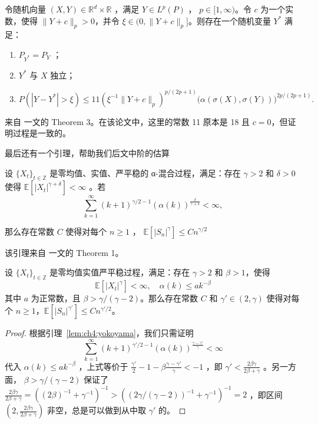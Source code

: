 \begin{lemma}[Bradley 引理]\label{lem:ch4:bradley}

令随机向量 $(X,Y)\in \mathbb{R}^d\times \mathbb{R}$ ，满足 $Y\in L^p(P)$ ， $p\in [1,\infty)$。令 $c$ 为一个实数，使得 $\| Y + c\| _p > 0$，并令 $\xi \in (0,\| Y + c\| _p]$。则存在一个随机变量 $Y^{*}$ 满足：

\begin{enumerate}
\def\labelenumi{\arabic{enumi}.}
\tightlist
\item
  $P_{Y^{*}} = P_{Y}$ ；
\item
  $Y^{*}$ 与 $X$ 独立；
\item
  \[
  P(|Y-Y^*|>\xi)
  \leq 11(\xi^{-1}\|Y+c\|_p)^{p/(2p+1)}
  \bigl(\alpha(\sigma(X),\sigma(Y))\bigr)^{2p/(2p+1)}.
  \]
\end{enumerate}

\end{lemma}
来自 \cite{bradley1983} 一文的 Theorem 3。在该论文中，这里的常数 11 原本是 18 且 $c = 0$，但证明过程是一致的。

最后还有一个引理，帮助我们后文中阶的估算


\begin{lemma}[横山良三矩界]\label{lem:ch4:yokoyama}

设 $\{X_t\}_{t\in \mathbb Z}$ 是零均值、实值、严平稳的 α-混合过程，满足：存在 $\gamma>2$ 和 $\delta>0$ 使得 $\mathbb{E}[|X_t|^{\gamma+\delta}] < \infty$ 。若
\[
\sum_{k=1}^\infty(k+1)^{\gamma/2-1}(\alpha(k))^{\frac\delta{\gamma+\delta}}<\infty,
\]

那么存在常数 $C$ 使得对每个 $n\ge 1$ ， $\mathbb{E}[|S_n|^\gamma]\le Cn^{\gamma/2}$

\end{lemma}
该引理来自 \cite{yokoyama1980} 一文的 Theorem 1。


\begin{corollary}\label{cor:ch4:moment-bound}
设 $\{X_t\}_{t\in \mathbb Z}$ 是零均值实值严平稳过程，满足：存在 $\gamma > 2$ 和 $\beta > 1$，使得
\[\mathbb{E}[|X_t|^\gamma] < \infty , \quad \alpha (k) \leq a k^{-\beta}\]
其中 $a$ 为正常数，且 $\beta > \gamma / (\gamma - 2)$。那么存在常数 $C$ 和 $\gamma'\in(2,\gamma)$ 使得对每个 $n\ge 1$，$\mathbb{E}[|S_n|^{\gamma'}]\le Cn^{\gamma'/2}$。
\end{corollary}

\begin{proof}

根据引理~\ref{lem:ch4:yokoyama}，我们只需证明 
$$\sum_{k=1}^\infty(k+1)^{\gamma'/2-1}(\alpha(k))^{\frac{\gamma-\gamma'}{\gamma}}<\infty$$
代入 $\alpha (k) \leq a k^{-\beta}$ ，上式等价于 $\frac{\gamma'}2-1-\beta\frac{\gamma-\gamma'}{\gamma}<-1$ ，即 $\gamma'<\frac{2\beta\gamma}{2\beta+\gamma}$ 。另一方面， $\beta > \gamma / (\gamma - 2)$ 保证了 $\frac{2\beta\gamma}{2\beta+\gamma}=((2\beta)^{-1}+\gamma^{-1})^{-1}>((2\gamma/(\gamma-2))^{-1}+\gamma^{-1})^{-1}=2$ ，即区间 $\left(2,\frac{2\beta\gamma}{2\beta+\gamma}\right)$ 非空，总是可以做到从中取 $\gamma'$ 的。

\end{proof}

